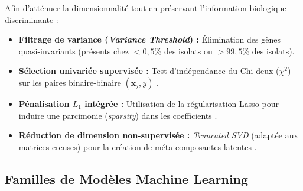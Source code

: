 \documentclass[11pt,a4paper]{article}
\begin{document}
Afin d'atténuer la dimensionnalité tout en préservant l'information biologique discriminante :
\begin{itemize}[leftmargin=*, label=$\bullet$]
    \item \textbf{Filtrage de variance (\textit{Variance Threshold}) :} Élimination des gènes quasi-invariants (présents chez $<0,5\%$ des isolats ou $>99,5\%$ des isolats).
    \item \textbf{Sélection univariée supervisée :} Test d'indépendance du Chi-deux ($\chi^2$) sur les paires binaire-binaire $(\mathbf{x}_j, y)$ \citep{agresti2013categorical}.
    \item \textbf{Pénalisation $L_1$ intégrée :} Utilisation de la régularisation Lasso pour induire une parcimonie (\textit{sparsity}) dans les coefficients \citep{tibshirani1996regression}.
    \item \textbf{Réduction de dimension non-supervisée :} \textit{Truncated SVD} (adaptée aux matrices creuses) pour la création de méta-composantes latentes \citep{halko2011finding}.
\end{itemize}

\subsection{Familles de Modèles Machine Learning}
\end{document}
